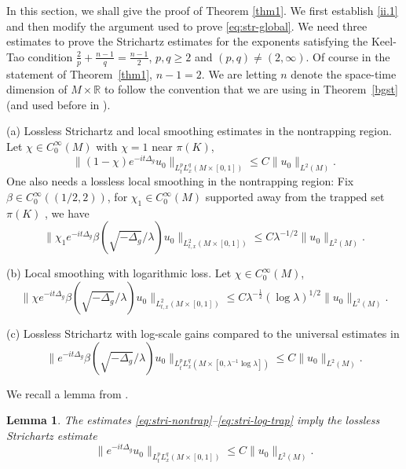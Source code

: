 \documentclass[10pt]{amsart}
\newtheorem{lemma}[theorem]{Lemma}
\newcommand{\la}{\lambda}
\newcommand{\1}{{\bf 1}}
\newcommand{\R}{{\mathbb R}}
\begin{document}

In this section, we shall give the proof of 
Theorem \ref{thm1}. We first establish \eqref{ii.1} and then modify the argument used to prove \eqref{eq:str-global}. We need three estimates 
to prove the Strichartz estimates for the exponents satisfying the Keel-Tao condition
 $\frac{2}{p}+\frac{n-1}{q}=\frac{n-1}{2}$, $p,q\geq 2$ and $(p,q)\neq (2,\infty)$.  Of course in the statement of Theorem~\ref{thm1}, $n-1=2$.  We are letting
$n$ denote the space-time dimension of $M\times \R$ to follow the convention that we are using in Theorem~\ref{bgst} (and used before in \cite{HSst}).


\noindent (a) Lossless Strichartz and local smoothing estimates in the nontrapping region. Let $\chi\in C_0^{\infty}(M)$ with $\chi=1$ near $\pi(K)$,
    \begin{equation}\label{eq:stri-nontrap}
    \|(1-\chi) e^{-it\Delta_g}u_0\|_{L^p_tL^q_x(M\times [0,1])}\leq C \|u_0\|_{L^2(M)}.
\end{equation}
One also needs a lossless local smoothing in the nontrapping region: Fix $\beta\in C_0^{\infty}((1/2,2))$,  for $\chi_1\in C_0^{\infty}(M)$ supported away from the trapped set $\pi(K)$ , we have 
\begin{equation}\label{eq:local-sm-nontrap}
   \|\chi_1 e^{-it\Delta_g}\beta(\sqrt{-\Delta_g}/\la)u_0 \|_{L^2_{t,x}(M\times [0,1])}\leq C\la^{-1/2}\|u_0\|_{L^2(M)}.
\end{equation}




\noindent (b) Local smoothing with logarithmic loss. Let $\chi\in C_0^{\infty}(M)$,
\begin{equation}\label{eq:local-sm-logloss}
    \|\chi e^{-it\Delta_g}\beta(\sqrt{-\Delta_g}/\la)u_0 \|_{L^2_{t,x}(M\times [0,1])}\leq C\la^{-\frac12}(\log \la)^{1/2}\|u_0\|_{L^2(M)}.
\end{equation}




\noindent(c) Lossless Strichartz with log-scale gains compared to the universal estimates in \cite{BGT}
 \begin{equation}\label{eq:stri-log-trap}
    \| e^{-it\Delta_g}\beta(\sqrt{-\Delta_g}/\la)u_0\|_{L^p_tL^q_x(M\times [0,\la^{-1}\log\la])}\leq C \|u_0\|_{L^2(M)}.
\end{equation}




We recall a lemma from \cite{BGH}.
\begin{lemma}\label{bghlemma}
    The estimates \eqref{eq:stri-nontrap}--\eqref{eq:stri-log-trap} imply the lossless Strichartz estimate
\begin{equation}\label{eq:stri-lossless}
    \|e^{-it\Delta_g}u_0\|_{L^p_tL^q_x(M\times [0,1])}\leq C \|u_0\|_{L^2(M)}.
\end{equation}
\end{lemma} 
\end{document}
